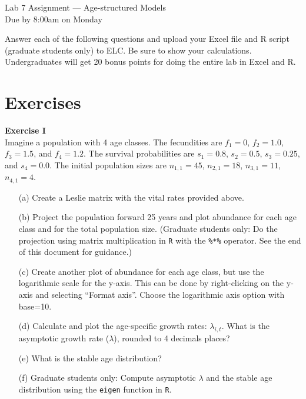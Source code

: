 \documentclass[12pt]{article}\usepackage[]{graphicx}\usepackage[]{xcolor}
\begin{document}
{
  \Large
  \centering
  Lab 7 Assignment --- Age-structured Models \\
  Due by 8:00am on Monday \par
}

\vspace{12pt}

Answer each of the following questions and upload your Excel file and
R script (graduate students only) to ELC. Be sure to show your
calculations. Undergraduates will get 20 bonus points for doing the entire 
lab in Excel and R. \\ 

\section*{Exercises}


{\bf Exercise I \\}
Imagine a population with 4 age classes. The fecundities are $f_1=0$,
$f_2=1.0$, $f_3=1.5$, and $f_4=1.2$. The survival probabilities are
$s_1=0.8$, $s_2=0.5$, $s_3=0.25$, and $s_4=0.0$. The initial
population sizes are $n_{1,1}=45$, $n_{2,1}=18$, $n_{3,1}=11$, $n_{4,1}=4$.
\begin{itemize}
  \item[(a)] Create a Leslie matrix with the vital rates provided above.
  \item[(b)] Project the population forward 25 years and plot abundance for
    each age class and for the total population size. (Graduate students
    only: Do the projection using matrix multiplication in {\tt R} with
    the \texttt{\%*\%} operator. See the end of this document for
    guidance.)
  \item[(c)] Create another plot of abundance for each age class, but use the
    logarithmic scale for the y-axis. This can be done by right-clicking
    on the y-axis and selecting ``Format axis''. Choose the logarithmic
    axis option with base=10.
  \item[(d)] Calculate and plot the age-specific
    growth rates: $\lambda_{i,t}$. What is the asymptotic growth rate
    ($\lambda$), rounded to 4 decimals places?
  \item[(e)] What is the stable age distribution?
  \item[(f)] Graduate students only: Compute asymptotic $\lambda$ and
    the stable age distribution using the \texttt{eigen} function in {\tt R}.
\end{itemize}
\end{document}
